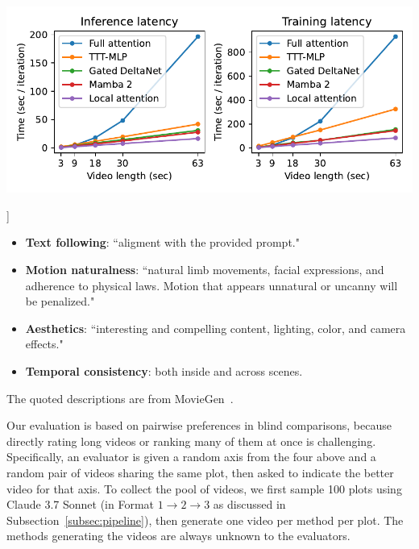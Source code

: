 {    \begin{minipage}[c]{0.66\textwidth}
    \vspace{2ex}
        \includegraphics[width=\linewidth]{figs/latency.pdf}
    \end{minipage}\hfill
    \begin{minipage}[c]{0.33\textwidth}
    \vspace{2ex}
        \label{fig:your_label}
    \end{minipage}
    \vspace{1.0em}
}]

\begin{itemize}[itemsep=0.2em]
\item \textbf{Text following}: ``aligment with the provided prompt."
\item \textbf{Motion naturalness}: ``natural limb
movements, facial expressions, and adherence to physical laws.
Motion that appears unnatural or uncanny will be penalized."
\item \textbf{Aesthetics}: ``interesting and compelling content, lighting, color, and camera effects."
\item \textbf{Temporal consistency}: both inside and across scenes.
\end{itemize}
The quoted descriptions are from MovieGen~\cite{meta2024moviegen}.


Our evaluation is based on pairwise preferences in blind comparisons, because directly rating long videos or ranking many of them at once is challenging.
Specifically, an evaluator is given a random axis from the four above and a random pair of videos sharing the same plot, then asked to indicate the better video for that axis.
To collect the pool of videos, we first sample 100 plots using Claude 3.7 Sonnet (in Format $1\rightarrow2\rightarrow3$ as discussed in Subsection~\ref{subsec:pipeline}), then generate one video per method per plot.
The methods generating the videos are always unknown to the evaluators.

